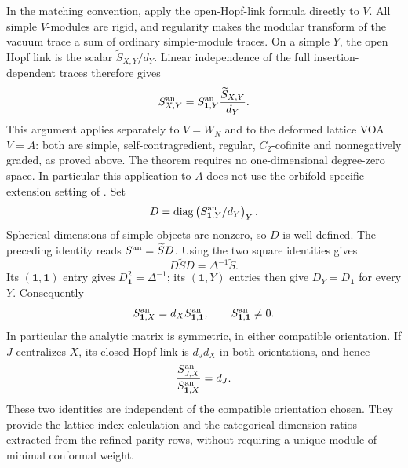 \documentclass[11pt,a4paper]{article}
\numberwithin{equation}{section}
\theoremstyle{definition}\newtheorem{definition}[theorem]{Definition}
\theoremstyle{remark}\newtheorem{remark}[theorem]{Remark}
\begin{document}
In the matching convention, apply the open-Hopf-link formula
\cite[Theorem 5.2, equation (5.5)]{mcrae} directly to $V$.
All simple $V$-modules are rigid, and regularity makes the modular
transform of the vacuum trace a sum of ordinary simple-module traces.
On a simple $Y$, the open Hopf link is the scalar
$\widetilde S_{X,Y}/d_Y$. Linear independence of the full
insertion-dependent traces therefore gives
\[
 S^{\rm an}_{X,Y}
  =S^{\rm an}_{\mathbf1,Y}\frac{\widetilde S_{X,Y}}{d_Y}.
\]
This argument applies separately to $V=W_N$ and to the deformed
lattice VOA $V=A$: both are simple, self-contragredient, regular,
$C_2$-cofinite and nonnegatively graded, as proved above. The theorem
requires no one-dimensional degree-zero space. In particular this
application to $A$ does not use the orbifold-specific extension
setting of \cite[Remark 5.21]{mcrae}. Set
\[
 D=\operatorname{diag}\left(
       S^{\rm an}_{\mathbf1,Y}/d_Y\right)_Y.
\]
Spherical dimensions of simple objects are nonzero, so $D$ is
well-defined.  The preceding identity reads
$S^{\rm an}=\widetilde SD$.
Using the two square identities gives
\[
 D\widetilde SD=\Delta^{-1}\widetilde S.
\]
Its $(\mathbf1,\mathbf1)$ entry gives
$D_{\mathbf1}^2=\Delta^{-1}$; its $(\mathbf1,Y)$ entries then give
$D_Y=D_{\mathbf1}$ for every $Y$.
Consequently
\begin{equation}\label{eq:analytic-vacuum-row}
 S^{\rm an}_{\mathbf1,X}
    =d_X S^{\rm an}_{\mathbf1,\mathbf1},\qquad
 S^{\rm an}_{\mathbf1,\mathbf1}\ne0.
\end{equation}
In particular the analytic matrix is symmetric, in either compatible
orientation. If $J$ centralizes $X$, its closed Hopf link is
$d_Jd_X$ in both orientations, and hence
\begin{equation}\label{eq:analytic-centralizer-row}
 \frac{S^{\rm an}_{J,X}}{S^{\rm an}_{\mathbf1,X}}=d_J.
\end{equation}
These two identities are independent of the compatible orientation
chosen.  They provide the lattice-index calculation and the
categorical dimension ratios extracted from the refined parity
rows, without requiring a unique module of minimal conformal
weight.
\end{document}
